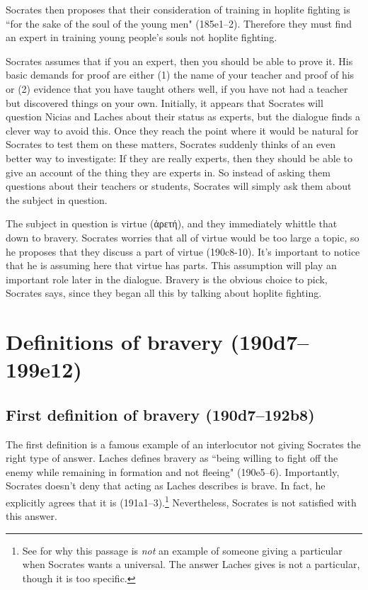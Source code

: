 \documentclass[11pt]{article}
\begin{document}
Socrates then proposes that their consideration of training in hoplite
fighting is ``for the sake of the soul of the young men" (185e1--2).
Therefore they must find an expert in training young people's souls not
hoplite fighting.

Socrates assumes that if you an expert, then you should be able to prove
it.  His basic demands for proof are either (1) the name of your teacher
and proof of his  or (2) evidence that you have taught
others well, if you have not had a teacher but discovered things on your
own.  Initially, it appears that Socrates will question Nicias and Laches
about their status as experts, but the dialogue finds a clever way to avoid
this.  Once they reach the point where it would be natural for Socrates to
test them on these matters, Socrates suddenly thinks of an even better way
to investigate: If they are really experts, then they should be able to
give an account of the thing they are experts in.  So instead of asking
them questions about their teachers or students, Socrates will simply ask
them about the subject in question.

The subject in question is virtue ({\g ἀρετή}), and they immediately
whittle that down to bravery.  Socrates worries that all of virtue would be
too large a topic, so he proposes that they discuss a part of virtue
(190c8-10).  It's important to notice that he is assuming here that virtue
has parts.  This assumption will play an important role later in the
dialogue.  Bravery is the obvious choice to pick, Socrates says, since they
began all this by talking about hoplite fighting.


\section{Definitions of bravery (190d7--199e12)}

\subsection{First definition of bravery (190d7--192b8)}

The first definition is a famous example of an interlocutor not giving
Socrates the right type of answer.  Laches defines bravery as ``being
willing to fight off the enemy while remaining in formation and not
fleeing" (190e5--6).  Importantly, Socrates doesn't deny that acting as
Laches describes is brave.  In fact, he explicitly agrees that it is
(191a1--3).\footnote{See \citet{nehamas1975} for why this passage is
\emph{not} an example of someone giving a particular when Socrates
wants a universal.  The answer Laches gives is not a particular, though it
is too specific.}  Nevertheless, Socrates is not satisfied with this
answer.
\end{document}
